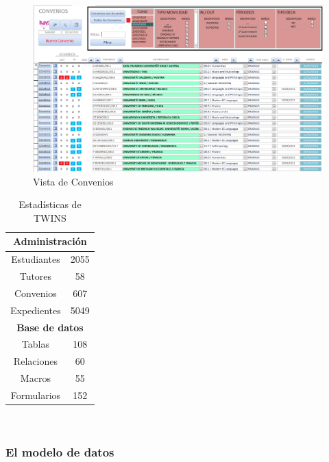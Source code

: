 \begin{figure}
	\includegraphics[width=\textwidth]{img/Capturas de TWINS/vistaConvenios.png}
	\caption[Convenios]{Vista de Convenios}
	\label{fig:vistaConvenios}
\end{figure}

\begin{table}[h]
	\begin{center}
		\begin{tabular}{ | c | c | } 
			\hline
			\multicolumn{2}{|c|}{\textbf{Administración}} \\
			\hline
			Estudiantes \footnotemark & 2055 \\ 
			\hline
			Tutores & 58 \\
			\hline
			Convenios  & 607 \\ 
			\hline
			Expedientes & 5049 \\ 
			\hline
			\multicolumn{2}{|c|}{\textbf{Base de datos}} \\
			\hline
			Tablas & 108 \\
			\hline
			Relaciones & 60 \\
			\hline
			Macros & 55 \\
			\hline
			Formularios & 152 \\
			\hline
		\end{tabular}
		\caption{Estadísticas de TWINS}
		\label{tab:estadisticasTWINS}
	\end{center}
\end{table}~



\subsubsection{El modelo de datos}
\label{ModeloDatos}

